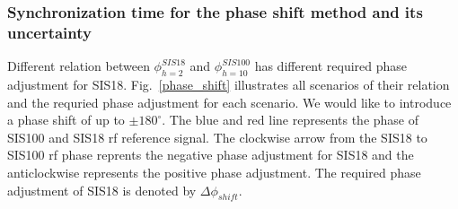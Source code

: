 \subsubsection{Synchronization time for the phase shift method and its uncertainty}
Different relation between $\phi_{h=2}^{SIS18}$ and $\phi_{h=10}^{SIS100}$ has different required phase adjustment for SIS18. Fig.~\ref{phase_shift} illustrates all scenarios of their relation and the requried phase adjustment for each scenario. We would like to introduce a phase shift of up to $\pm 180^\circ$. The blue and red line represents the phase of SIS100 and SIS18 rf reference signal. The clockwise arrow from the SIS18 to SIS100 rf phase reprents the negative phase adjustment for SIS18 and the anticlockwise represents the positive phase adjustment. The required phase adjustment of SIS18 is denoted by $\Delta \phi_{shift}$.
